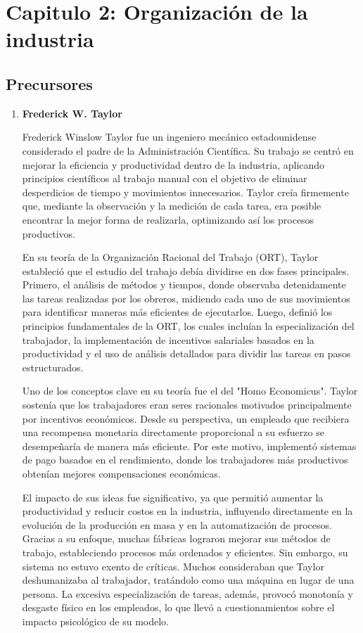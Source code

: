 \documentclass[a4paper,oneside,11pt]{article}
\begin{document}
\newpage

\section{Capitulo 2: Organización de la industria}

\subsection{Precursores}

\begin{enumerate}
    \item \textbf{Frederick W. Taylor}
    
        Frederick Winslow Taylor fue un ingeniero mecánico estadounidense considerado el padre de la Administración Científica. Su trabajo se centró en mejorar la eficiencia y productividad dentro de la industria, aplicando principios científicos al trabajo manual con el objetivo de eliminar desperdicios de tiempo y movimientos innecesarios. Taylor creía firmemente que, mediante la observación y la medición de cada tarea, era posible encontrar la mejor forma de realizarla, optimizando así los procesos productivos.

        En su teoría de la Organización Racional del Trabajo (ORT), Taylor estableció que el estudio del trabajo debía dividirse en dos fases principales. Primero, el análisis de métodos y tiempos, donde observaba detenidamente las tareas realizadas por los obreros, midiendo cada uno de sus movimientos para identificar maneras más eficientes de ejecutarlos. Luego, definió los principios fundamentales de la ORT, los cuales incluían la especialización del trabajador, la implementación de incentivos salariales basados en la productividad y el uso de análisis detallados para dividir las tareas en pasos estructurados.
        
        Uno de los conceptos clave en su teoría fue el del "Homo Economicus". Taylor sostenía que los trabajadores eran seres racionales motivados principalmente por incentivos económicos. Desde su perspectiva, un empleado que recibiera una recompensa monetaria directamente proporcional a su esfuerzo se desempeñaría de manera más eficiente. Por este motivo, implementó sistemas de pago basados en el rendimiento, donde los trabajadores más productivos obtenían mejores compensaciones económicas.
        
        El impacto de sus ideas fue significativo, ya que permitió aumentar la productividad y reducir costos en la industria, influyendo directamente en la evolución de la producción en masa y en la automatización de procesos. Gracias a su enfoque, muchas fábricas lograron mejorar sus métodos de trabajo, estableciendo procesos más ordenados y eficientes. Sin embargo, su sistema no estuvo exento de críticas. Muchos consideraban que Taylor deshumanizaba al trabajador, tratándolo como una máquina en lugar de una persona. La excesiva especialización de tareas, además, provocó monotonía y desgaste físico en los empleados, lo que llevó a cuestionamientos sobre el impacto psicológico de su modelo.
        

\end{enumerate}
\end{document}
